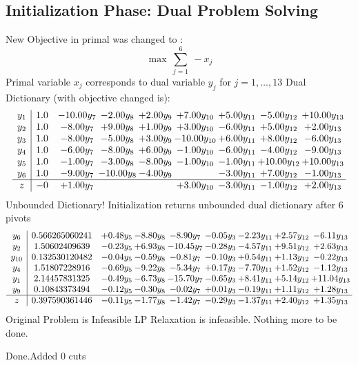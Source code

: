 \documentclass[8pt]{article}
\begin{document}
\subsection{Initialization Phase: Dual Problem Solving}
New Objective in primal was changed to : \[ \max\ \sum_{j=1}^{6}\ - x_j \] 
Primal variable $x_j$ corresponds to dual variable $y_j$ for $j = 1,\ldots,13$
Dual Dictionary (with objective changed is): 
\[\begin{array}{c| c c@{\hskip 2pt} c@{\hskip 2pt} c@{\hskip 2pt} c@{\hskip 2pt} c@{\hskip 2pt} c@{\hskip 2pt} c@{\hskip 2pt} }
 y_{1}   &  1.0 & -10.00 y_{7} & -2.00 y_{8} & +  2.00 y_{9} & +  7.00 y_{10} & +  5.00 y_{11} & -5.00 y_{12} & + 10.00 y_{13}\\
 y_{2}   &  1.0 & -8.00 y_{7} & +  9.00 y_{8} & +  1.00 y_{9} & +  3.00 y_{10} & -6.00 y_{11} & +  5.00 y_{12} & +  2.00 y_{13}\\
 y_{3}   &  1.0 & -8.00 y_{7} & -5.00 y_{8} & +  3.00 y_{9} & -10.00 y_{10} & +  6.00 y_{11} & +  8.00 y_{12} & -6.00 y_{13}\\
 y_{4}   &  1.0 & -6.00 y_{7} & -8.00 y_{8} & +  6.00 y_{9} & -1.00 y_{10} & -6.00 y_{11} & -4.00 y_{12} & -9.00 y_{13}\\
 y_{5}   &  1.0 & -1.00 y_{7} & -3.00 y_{8} & -8.00 y_{9} & -1.00 y_{10} & -1.00 y_{11} & + 10.00 y_{12} & + 10.00 y_{13}\\
 y_{6}   &  1.0 & -9.00 y_{7} & -10.00 y_{8} & -4.00 y_{9} &   & -3.00 y_{11} & +  7.00 y_{12} & -1.00 y_{13}\\
\hline
z    &  -0 & +  1.00 y_{7} &    &   & +  3.00 y_{10} & -3.00 y_{11} & -1.00 y_{12} & +  2.00 y_{13}\\
\end{array}\]
Unbounded Dictionary!
Initialization returns unbounded dual dictionary after 6 pivots
\[\begin{array}{c| c c@{\hskip 2pt} c@{\hskip 2pt} c@{\hskip 2pt} c@{\hskip 2pt} c@{\hskip 2pt} c@{\hskip 2pt} c@{\hskip 2pt} }
 y_{6}   &  0.566265060241 & +  0.48 y_{5} & -8.80 y_{8} & -8.90 y_{7} & -0.05 y_{3} & -2.23 y_{11} & +  2.57 y_{12} & -6.11 y_{13}\\
 y_{2}   &  1.50602409639 & -0.23 y_{5} & +  6.93 y_{8} & -10.45 y_{7} & -0.28 y_{3} & -4.57 y_{11} & +  9.51 y_{12} & +  2.63 y_{13}\\
 y_{10}   &  0.132530120482 & -0.04 y_{5} & -0.59 y_{8} & -0.81 y_{7} & -0.10 y_{3} & +  0.54 y_{11} & +  1.13 y_{12} & -0.22 y_{13}\\
 y_{4}   &  1.51807228916 & -0.69 y_{5} & -9.22 y_{8} & -5.34 y_{7} & +  0.17 y_{3} & -7.70 y_{11} & +  1.52 y_{12} & -1.12 y_{13}\\
 y_{1}   &  2.14457831325 & -0.49 y_{5} & -6.73 y_{8} & -15.70 y_{7} & -0.65 y_{3} & +  8.41 y_{11} & +  5.14 y_{12} & + 11.04 y_{13}\\
 y_{9}   &  0.10843373494 & -0.12 y_{5} & -0.30 y_{8} & -0.02 y_{7} & +  0.01 y_{3} & -0.19 y_{11} & +  1.11 y_{12} & +  1.28 y_{13}\\
\hline
z    &  0.397590361446 & -0.11 y_{5} & -1.77 y_{8} & -1.42 y_{7} & -0.29 y_{3} & -1.37 y_{11} & +  2.40 y_{12} & +  1.35 y_{13}\\
\end{array}\]
Original Problem is Infeasible
 LP Relaxation is infeasible. Nothing more to be done. 

Done.Added 0 cuts 
\end{document}
